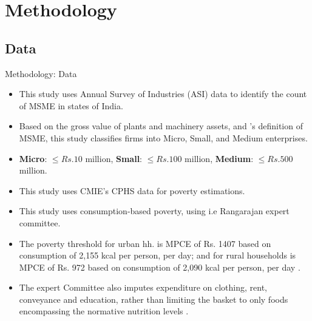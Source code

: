 \documentclass[10pt,aspectratio=169]{beamer}
\begin{document}
\section{Methodology}
\subsection{Data}
\begin{frame}{Methodology: Data}
    \fontsize{10pt}{12pt}\selectfont
    \begin{itemize}
        \item This study uses Annual Survey of Industries (ASI) data to identify the count of MSME in states of India.
    \item   Based on the gross value of plants and machinery assets, and \textcite{MinistryOfMSME2020}'s definition of MSME, this study classifies firms into Micro, Small, and Medium enterprises.
    \item \textbf{Micro}: $\leq Rs. 10$ million, \textbf{Small}: $\leq Rs. 100$ million, \textbf{Medium}: $\leq Rs. 500$ million.
    \vspace{0.5cm}
     \item This study uses CMIE's CPHS data for poverty estimations.
      \item  This study uses consumption-based poverty, using \textcite{rangarajan2014} i.e Rangarajan expert committee.
    \item The poverty threshold for urban hh. is MPCE of Rs. 1407 based on consumption of 2,155 kcal per person, per day; and for rural households is MPCE of Rs. 972 based on consumption of 2,090 kcal per person, per day \parencite{rangarajan2014}.   
    \item The expert Committee also imputes expenditure on clothing, rent, conveyance and education, rather than limiting the basket to only foods encompassing the normative nutrition levels \parencite{rangarajan2014}.
\end{itemize}
\end{frame}
\end{document}
